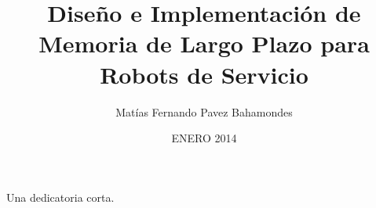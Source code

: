 \documentclass[upright, contnum]{umemoria}
\author{Matías Fernando Pavez Bahamondes}
\title{Diseño e Implementación de Memoria de Largo Plazo para Robots de Servicio}
\date{ENERO 2014}
\begin{document}
\frontmatter
\maketitle

\begin{abstract}
\lipsum[1-4]
\end{abstract}

\begin{dedicatoria}
Una dedicatoria corta.
\end{dedicatoria}

\begin{thanks}
\lipsum[1-2]
\end{thanks}

\cleardoublepage
\tableofcontents
\cleardoublepage
\listoftables
\cleardoublepage
\listoffigures

\mainmatter






\nocite{*}


\end{document}
